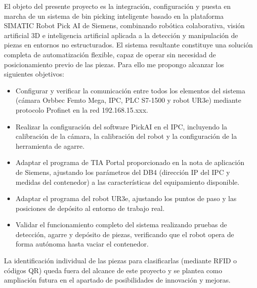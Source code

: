 \clearpage
{}


El objeto del presente proyecto es la integración, configuración y puesta en marcha de un sistema de bin picking inteligente basado en la plataforma SIMATIC Robot Pick AI de Siemens, combinando robótica colaborativa, visión artificial 3D e inteligencia artificial aplicada a la detección y manipulación de piezas en entornos no estructurados. El sistema resultante constituye una solución completa de automatización flexible, capaz de operar sin necesidad de posicionamiento previo de las piezas.
Para ello me propongo alcanzar los siguientes objetivos:

\begin{itemize}
	\item Configurar y verificar la comunicación entre todos los elementos del sistema (cámara Orbbec Femto Mega, IPC, PLC S7-1500 y robot UR3e) mediante protocolo Profinet en la red 192.168.15.xxx.

	\item Realizar la configuración del software PickAI en el IPC, incluyendo la calibración de la cámara, la calibración del robot y la configuración de la herramienta de agarre.

	\item Adaptar el programa de TIA Portal proporcionado en la nota de aplicación de Siemens, ajustando los parámetros del DB4 (dirección IP del IPC y medidas del contenedor) a las características del equipamiento disponible.

	\item Adaptar el programa del robot UR3e, ajustando los puntos de paso y las posiciones de depósito al entorno de trabajo real.

	\item Validar el funcionamiento completo del sistema realizando pruebas de detección, agarre y depósito de piezas, verificando que el robot opera de forma autónoma hasta vaciar el contenedor.
\end{itemize}

La identificación individual de las piezas para clasificarlas (mediante RFID o códigos QR) queda fuera del alcance de este proyecto y se plantea como ampliación futura en el apartado de posibilidades de innovación y mejoras.
